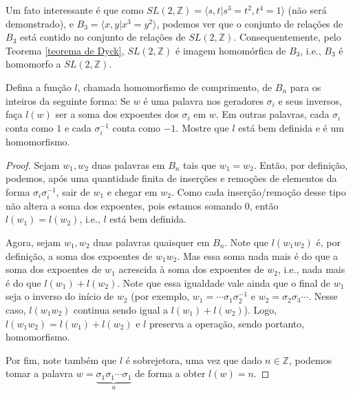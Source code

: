 	\par\vspace{0.3cm}
	
	\begin{remark}
		Um fato interessante é que como $SL(2,\mathbb{Z}) = \langle s,t | s^3 = t^2, t^4 = 1 \rangle$ (não será demonstrado), e $B_3 = \langle x,y| x^3 = y^2 \rangle$, podemos ver que o conjunto de relações de $B_3$ está contido no conjunto de relações de $SL(2,\mathbb{Z})$. Consequentemente, pelo Teorema \eqref{teorema de Dyck}, $SL(2,\mathbb{Z})$ é imagem homomórfica de $B_3$, i.e., $B_3$ é homomorfo a $SL(2,\mathbb{Z})$. 
	\end{remark}
	
	\par\vspace{0.3cm}
	
	\begin{lemma}
		\label{homomorfismo de comprimento}
		Defina a função $l$, chamada homomorfismo de comprimento, de $B_n$ para os inteiros da seguinte forma: Se $w$ é uma palavra nos geradores $\sigma_i$ e seus inversos, faça $l(w)$ ser a soma dos expoentes dos $\sigma_i$ em $w$. Em outras palavras, cada $\sigma_i$ conta como $1$ e cada $\sigma_i^{-1}$ conta como $-1$. Mostre que $l$ está bem definida e é um homomorfismo.
	\end{lemma}
	
	\begin{proof}
		Sejam $w_1,w_2$ duas palavras em $B_n$ tais que $w_1=w_2$. Então, por definição, podemos, após uma quantidade finita de inserções e remoções de elementos da forma $\sigma_i\sigma_i^{-1}$, sair de $w_1$ e chegar em $w_2$. Como cada inserção/remoção desse tipo não altera a soma dos expoentes, pois estamos somando 0, então $l(w_1)=l(w_2)$, i.e., $l$ está bem definida. 
		\par\vspace{0.3cm} Agora, sejam $w_1,w_2$ duas palavras quaisquer em $B_n$. Note que $l(w_1w_2)$ é, por definição, a soma dos expoentes de $w_1w_2$. Mas essa soma nada mais é do que a soma dos expoentes de $w_1$ acrescida à soma dos expoentes de $w_2$, i.e., nada mais é do que $l(w_1)+l(w_2)$. Note que essa igualdade vale ainda que o final de $w_1$ seja o inverso do início de $w_2$ (por exemplo, $w_1 = \cdots\sigma_1\sigma_2^{-1}$ e $w_2 = \sigma_2\sigma_3\cdots$. Nesse caso, $l(w_1w_2)$ continua sendo igual a $l(w_1) + l(w_2)$). Logo, $l(w_1w_2)=l(w_1)+l(w_2)$ e $l$ preserva a operação, sendo portanto, homomorfismo.
		\par\vspace{0.3cm} Por fim, note também que $l$ é sobrejetora, uma vez que dado $n\in\mathbb{Z}$, podemos tomar a palavra $w = \underbrace{\sigma_1\sigma_1\cdots\sigma_1}_{n}$ de forma a obter $l(w) = n$.
	\end{proof}
	
